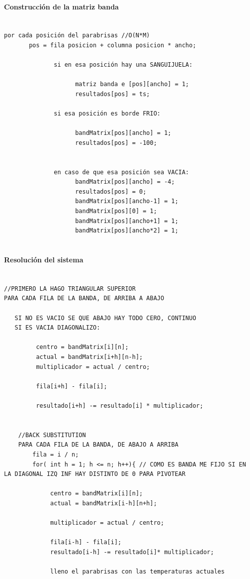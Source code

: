 \paragraph{Construcción de la matriz banda}
\begin{verbatim}

por cada posición del parabrisas //O(N*M)
       pos = fila posicion + columna posicion * ancho;
		
              si en esa posición hay una SANGUIJUELA:
			
                    matriz banda e [pos][ancho] = 1;
                    resultados[pos] = ts;
		
              si esa posición es borde FRIO:
                    
                    bandMatrix[pos][ancho] = 1;
                    resultados[pos] = -100;


              en caso de que esa posición sea VACIA:
                    bandMatrix[pos][ancho] = -4;
                    resultados[pos] = 0;              
                    bandMatrix[pos][ancho-1] = 1;
                    bandMatrix[pos][0] = 1;
                    bandMatrix[pos][ancho+1] = 1;
                    bandMatrix[pos][ancho*2] = 1;
		

\end{verbatim}

\paragraph{Resolución del sistema}

\begin{verbatim}

//PRIMERO LA HAGO TRIANGULAR SUPERIOR
PARA CADA FILA DE LA BANDA, DE ARRIBA A ABAJO
		
   SI NO ES VACIO SE QUE ABAJO HAY TODO CERO, CONTINUO
   SI ES VACIA DIAGONALIZO:
        
         centro = bandMatrix[i][n];
         actual = bandMatrix[i+h][n-h];
         multiplicador = actual / centro;
		
         fila[i+h] - fila[i];

         resultado[i+h] -= resultado[i] * multiplicador;
   

    //BACK SUBSTITUTION
    PARA CADA FILA DE LA BANDA, DE ABAJO A ARRIBA
        fila = i / n;
        for( int h = 1; h <= n; h++){ // COMO ES BANDA ME FIJO SI EN LA DIAGONAL IZQ INF HAY DISTINTO DE 0 PARA PIVOTEAR
           
             centro = bandMatrix[i][n];
             actual = bandMatrix[i-h][n+h];
           
             multiplicador = actual / centro;
		
             fila[i-h] - fila[i];
             resultado[i-h] -= resultado[i]* multiplicador;
                
             lleno el parabrisas con las temperaturas actuales
\end{verbatim}


